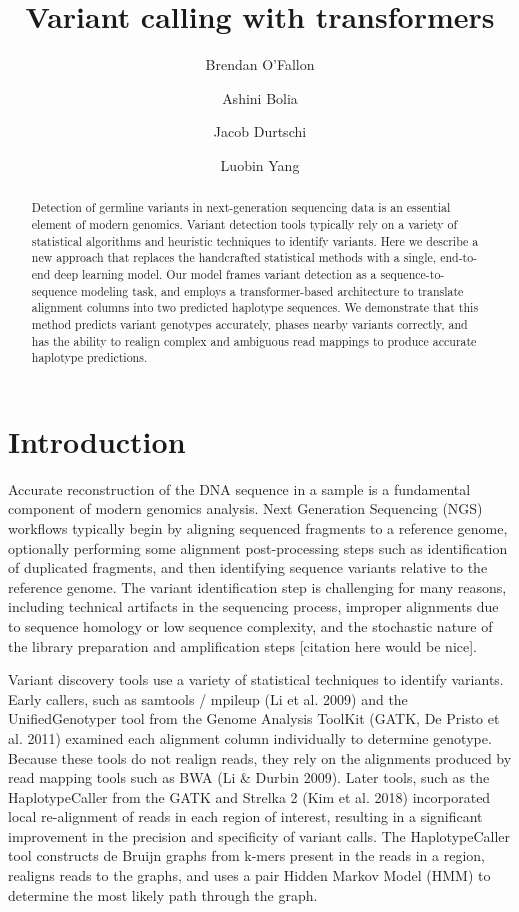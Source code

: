 \documentclass[]{article}
\title{Variant calling with transformers}
\author[1]{Brendan O'Fallon}
\author[1]{Ashini Bolia}
\author[1]{Jacob Durtschi}
\author[1]{Luobin Yang}
\affil[1]{ARUP Institute for Clinical and Experimental Pathology, Salt Lake City, UT}
\date{}
\begin{document}
\maketitle

\begin{abstract}
	Detection of germline variants in next-generation sequencing data is an essential element of modern genomics. Variant detection tools typically rely on a variety of statistical algorithms and heuristic techniques to identify variants. Here we describe a new approach that replaces the handcrafted statistical methods with a single, end-to-end deep learning model. Our model frames variant detection as a sequence-to-sequence modeling task, and employs a transformer-based architecture to translate alignment columns into two predicted haplotype sequences. We demonstrate that this method predicts variant genotypes accurately, phases nearby variants correctly, and has the ability to realign complex and ambiguous read mappings to produce accurate haplotype predictions. 

\end{abstract}



\section{Introduction}

Accurate reconstruction of the DNA sequence in a sample is a fundamental component of modern genomics analysis. Next Generation Sequencing (NGS) workflows typically begin by aligning sequenced fragments to a reference genome, optionally performing some alignment post-processing steps such as identification of duplicated fragments, and then identifying sequence variants relative to the reference genome. The variant identification step is challenging for many reasons, including technical artifacts in the sequencing process, improper alignments due to sequence homology or low sequence complexity, and the stochastic nature of the library preparation and amplification steps [citation here would be nice]. 


Variant discovery tools use a variety of statistical techniques to identify variants. Early callers, such as samtools / mpileup (Li et al. 2009) and the UnifiedGenotyper tool from the Genome Analysis ToolKit (GATK, De Pristo et al. 2011) examined each alignment column individually to determine genotype. Because these tools do not realign reads, they rely on the alignments produced by read mapping tools such as BWA (Li \& Durbin 2009). Later tools, such as the HaplotypeCaller from the GATK and Strelka 2 (Kim et al. 2018) incorporated local re-alignment of reads in each region of interest, resulting in a significant improvement in the precision and specificity of variant calls. The HaplotypeCaller tool constructs de Bruijn graphs from k-mers present in the reads in a region, realigns reads to the graphs, and uses a pair Hidden Markov Model (HMM) to determine the most likely path through the graph. 
\end{document}
